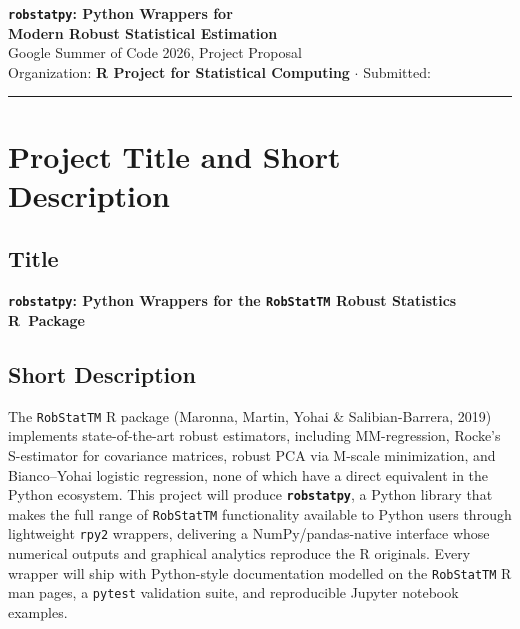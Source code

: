 \documentclass[11pt, a4paper]{article}
\begin{document}
\thispagestyle{empty}
\begin{center}
  {\LARGE\bfseries\color{uwpurple}
    \texttt{robstatpy}: Python Wrappers for\\[5pt]
    Modern Robust Statistical Estimation
  }\\[10pt]
  {\large\color{black}
    Google Summer of Code 2026, Project Proposal
  }\\[5pt]
  {\normalsize\color{black}
    Organization: \textbf{R Project for Statistical Computing}
    \quad $\cdot$ \quad
    Submitted: 
  }
\end{center}

\vspace{0.5em}
\noindent\textcolor{uwpurple}{\rule{\linewidth}{2pt}}
\vspace{0.3em}

\section{Project Title and Short Description}

\subsection*{Title}

\textbf{\texttt{robstatpy}: Python Wrappers for the \texttt{RobStatTM}
Robust Statistics R~Package}

\subsection*{Short Description}

The \texttt{RobStatTM} R package (Maronna, Martin, Yohai \& Salibian-Barrera, 2019)
implements state-of-the-art robust estimators, including MM-regression,
Rocke's S-estimator for covariance matrices, robust PCA via M-scale
minimization, and Bianco--Yohai logistic regression, none of which have a
direct equivalent in the Python ecosystem.
This project will produce \textbf{\texttt{robstatpy}}, a Python library that
makes the full range of \texttt{RobStatTM} functionality available to Python users
through lightweight \texttt{rpy2}
wrappers, delivering a NumPy/pandas-native interface whose numerical outputs
and graphical analytics reproduce the R originals.
Every wrapper will ship with Python-style documentation modelled on the
\texttt{RobStatTM} R man pages, a \texttt{pytest} validation suite, and
reproducible Jupyter notebook examples.
\end{document}
